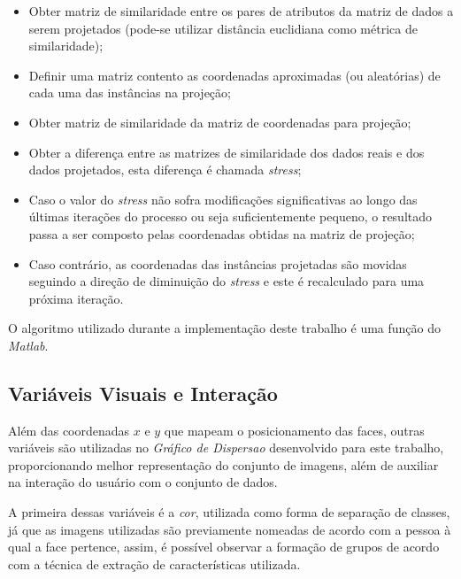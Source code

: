 \documentclass[conference]{IEEEtran}
\begin{document}
\begin{itemize}

\item Obter matriz de similaridade entre os pares de atributos da matriz de dados a serem projetados (pode-se utilizar distância euclidiana como métrica de similaridade);

\item Definir uma matriz contento as coordenadas aproximadas (ou aleatórias) de cada uma das instâncias na projeção;

\item Obter matriz de similaridade da matriz de coordenadas para projeção;

\item Obter a diferença entre as matrizes de similaridade dos dados reais e dos dados projetados, esta diferença é chamada \textit{stress};

\item Caso o valor do \textit{stress} não sofra modificações significativas ao longo das últimas iterações do processo ou seja suficientemente pequeno, o resultado passa a ser composto pelas coordenadas obtidas na matriz de projeção;

\item Caso contrário, as coordenadas das instâncias projetadas são movidas seguindo a direção de diminuição do \textit{stress} e este é recalculado para uma próxima iteração.   

\end{itemize}

O algoritmo utilizado durante a implementação deste trabalho é uma função do \textit{Matlab}.

\subsection{Variáveis Visuais e Interação}

Além das coordenadas $x$ e $y$ que mapeam o posicionamento das faces, outras variáveis são utilizadas no \textit{Gráfico de Dispersao} desenvolvido para este trabalho, proporcionando melhor representação do conjunto de imagens, além de auxiliar na interação do usuário com o conjunto de dados. 

A primeira dessas variáveis é a \textit{cor}, utilizada como forma de separação de classes, já que as imagens utilizadas são previamente nomeadas de acordo com a pessoa à qual a face pertence, assim, é possível observar a formação de grupos de acordo com a técnica de extração de características utilizada.
\end{document}
